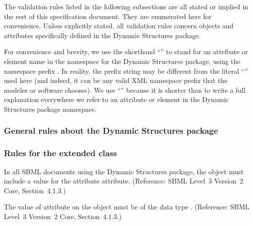 The validation rules listed in the following subsections are all stated
or implied in the rest of this specification document.  They are
enumerated here for convenience. Unless explicitly stated, all
validation rules concern objects and attributes specifically defined in
the Dynamic Structures package.

For \notice convenience and brevity, we use the shorthand
``'' to stand for an attribute or element name 
in the namespace for the Dynamic Structures package, using
the namespace prefix .  In reality, the prefix string may be
different from the literal ``'' used here (and indeed, it
can be any valid XML namespace prefix that the modeler or software
chooses).  We use ``'' because it is shorter than to
write a full explanation everywhere we refer to an attribute or element
in the Dynamic Structures package namespace.

\subsubsection*{General rules about the Dynamic Structures package}
  

\subsubsection*{Rules for the extended  class} 
 {In all SBML documents using the Dynamic Structures package, the \SBML object must include a value for  the attribute  attribute.  (Reference: SBML Level~3 Version~2 Core, Section~4.1.3.)}
  
 {The value of attribute  on the \SBML object must be of the data type . (Reference: SBML Level~3 Version~2 Core, Section~4.1.3.) }
  
